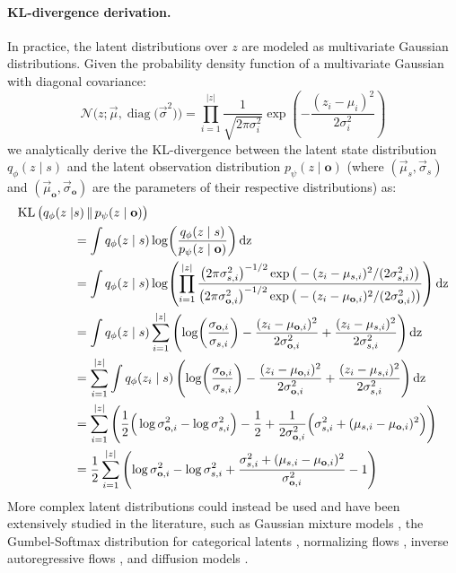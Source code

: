 \paragraph{KL-divergence derivation.}
In practice, the latent distributions over $z$ are modeled as multivariate Gaussian distributions.
Given the probability density function of a multivariate Gaussian with diagonal covariance:
\begin{equation}
    \mathcal{N}\Big(z; \vec{\mu}, \operatorname{diag}\big(\vec{\sigma}^2\big)\Big) = \prod_{i=1}^{|z|} \frac{1}{\sqrt{2\pi\sigma_i^2}} \exp \left( - \frac{(z_i - \mu_i)^2}{2\sigma_i^2} \right)
\end{equation}
we analytically derive the KL-divergence between the latent state distribution $q_\phi(z \mid s)$ and the latent observation distribution $p_\psi(z \mid \mathbf{o})$ (where $(\vec{\mu}_s, \vec{\sigma}_s)$ and $(\vec{\mu}_\mathbf{o}, \vec{\sigma}_\mathbf{o})$ are the parameters of their respective distributions) as:
\begin{align}
    \operatorname{KL}\big(q_\phi(z \mid& s) \, \Vert \, p_\psi(z \mid \mathbf{o})\big) \\
    &= \int q_\phi(z \mid s) \log \!\left( \frac{q_\phi(z \mid s)}{p_\psi(z \mid \mathbf{o})} \right) \rm{d}z \\
    &= \int q_\phi(z \mid s) \log \!\left( \prod_{i=1}^{|z|} \frac{\big(2\pi\sigma_{s,i}^2\big)^{-1/2}\exp\big(-(z_i - \mu_{s,i})^2 / (2\sigma_{s,i}^2) \big)}{\big(2\pi\sigma_{\mathbf{o},i}^2\big)^{-1/2}\exp\big(-(z_i - \mu_{\mathbf{o},i})^2 / (2\sigma_{\mathbf{o},i}^2) \big)} \right) \rm{d}z \\
    &= \int q_\phi(z \mid s) \sum_{i=1}^{|z|} \left( \log\!\left(\frac{\sigma_{\mathbf{o},i}}{\sigma_{s,i}} \right) - \frac{(z_i - \mu_{\mathbf{o},i})^2}{2\sigma_{\mathbf{o},i}^2} + \frac{(z_i - \mu_{s,i})^2}{2\sigma_{s,i}^2} \right) \rm{d}z \\
    &= \sum_{i=1}^{|z|} \int q_\phi(z_i \mid s) \left( \log\!\left(\frac{\sigma_{\mathbf{o},i}}{\sigma_{s,i}} \right) - \frac{(z_i - \mu_{\mathbf{o},i})^2}{2\sigma_{\mathbf{o},i}^2} + \frac{(z_i - \mu_{s,i})^2}{2\sigma_{s,i}^2} \right) \rm{d}z \\
    &= \sum_{i=1}^{|z|} \left( \frac{1}{2} \Big( \log \sigma_{\mathbf{o},i}^2 - \log \sigma_{s,i}^2 \Big) - \frac{1}{2} + \frac{1}{2\sigma_{\mathbf{o},i}^2} \Big(\sigma_{s,i}^2 + (\mu_{s,i} - \mu_{\mathbf{o},i})^2 \Big) \right) \\
    &= \frac{1}{2} \sum_{i=1}^{|z|} \left( \log \sigma_{\mathbf{o},i}^2 - \log \sigma_{s,i}^2 + \frac{\sigma_{s,i}^2 + (\mu_{s,i} - \mu_{\mathbf{o},i})^2}{\sigma_{\mathbf{o},i}^2} - 1 \right)
\end{align}
More complex latent distributions could instead be used and have been extensively studied in the literature, such as Gaussian mixture models \cite{dilokthanakul2016deep,tomczak2018vae}, the Gumbel-Softmax distribution for categorical latents \cite{jang2017categorical}, normalizing flows \cite{rezende2015variational}, inverse autoregressive flows \cite{kingma2016improved}, and diffusion models \cite{kingma2021variational}.


